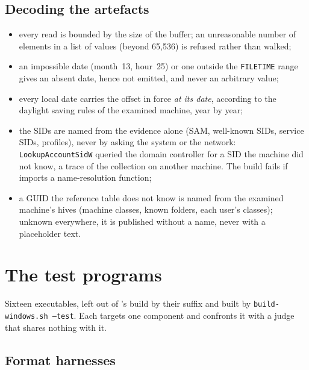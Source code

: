 \documentclass[11pt,a4paper,oneside]{report}
\begin{document}
\section{Decoding the artefacts}

\begin{itemize}
  \item every read is bounded by the size of the buffer; an unreasonable
    number of elements in a list of values (beyond 65,536) is refused rather
    than walked;
  \item an impossible date (month~13, hour~25) or one outside the
    \texttt{FILETIME} range gives an absent date, hence not emitted, and never
    an arbitrary value;
  \item every local date carries the offset in force \emph{at its date},
    according to the daylight saving rules of the examined machine, year by
    year;
  \item the SIDs are named from the evidence alone (SAM, well-known SIDs,
    service SIDs, profiles), never by asking the system or the network:
    \texttt{LookupAccountSidW} queried the domain controller for a SID the
    machine did not know, a trace of the collection on another machine. The
    build fails if  imports a name-resolution function;
  \item a GUID the reference table does not know is named from the examined
    machine's hives (machine classes, known folders, each user's classes);
    unknown everywhere, it is published without a name, never with a
    placeholder text.
\end{itemize}

\chapter{The test programs}\label{ch:harnais}

Sixteen executables, left out of \wac{}'s build by their
 suffix and built by \texttt{build-windows.sh --test}.
Each targets one component and confronts it with a judge that shares nothing
with it.

\section{Format harnesses}
\end{document}
